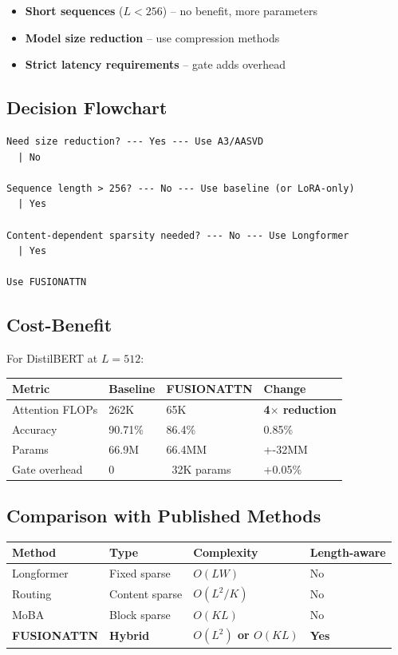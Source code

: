 \begin{itemize}
\item \textbf{Short sequences} ($L < 256$) -- no benefit, more parameters
\item \textbf{Model size reduction} -- use compression methods
\item \textbf{Strict latency requirements} -- gate adds overhead

\end{itemize}
\subsection{Decision Flowchart}

\begin{lstlisting}
Need size reduction? --- Yes --- Use A3/AASVD
  | No
   
Sequence length > 256? --- No --- Use baseline (or LoRA-only)
  | Yes
   
Content-dependent sparsity needed? --- No --- Use Longformer
  | Yes
   
Use FUSIONATTN
\end{lstlisting}

\subsection{Cost-Benefit}

For DistilBERT at $L = 512$:

\begin{table}[H]
\centering
\small
\begin{tabular}{llll}
\toprule
\textbf{Metric} & \textbf{Baseline} & \textbf{FUSIONATTN} & \textbf{Change} \\
\midrule
Attention FLOPs & 262K & 65K & \textbf{4$\times$ reduction} \\
Accuracy & 90.71\% & 86.4\% & 0.85\% \\
Params & 66.9M & 66.4MM & +-32MM \\
Gate overhead & 0 & ~32K params & +0.05\% \\
\bottomrule
\end{tabular}
\end{table}

\subsection{Comparison with Published Methods}

\begin{table}[H]
\centering
\small
\begin{tabular}{llll}
\toprule
\textbf{Method} & \textbf{Type} & \textbf{Complexity} & \textbf{Length-aware} \\
\midrule
Longformer & Fixed sparse & $O(LW)$ & No \\
Routing & Content sparse & $O(L^2/K)$ & No \\
MoBA & Block sparse & $O(KL)$ & No \\
\textbf{FUSIONATTN} & \textbf{Hybrid} & \textbf{$O(L^2)$ or $O(KL)$} & \textbf{Yes} \\
\bottomrule
\end{tabular}
\end{table}

